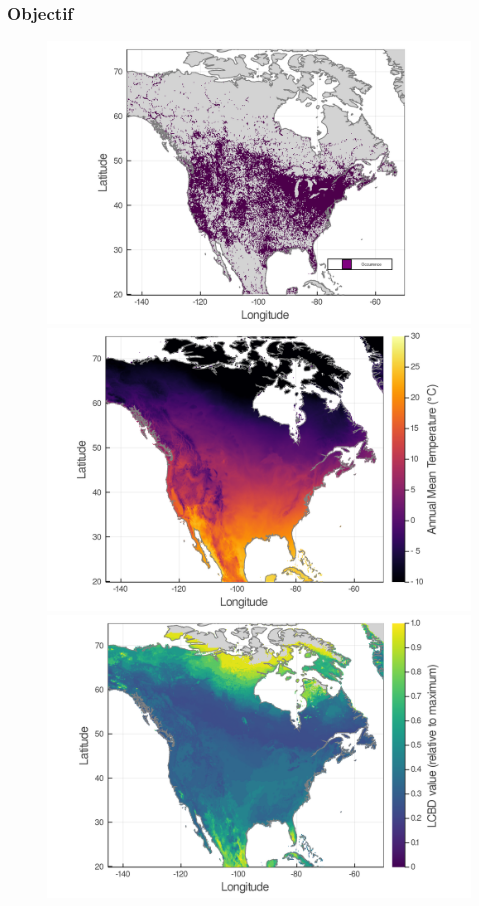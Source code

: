 \documentclass[10pt]{beamer}
\begin{document}
\begin{frame}
  \frametitle{Objectif}
  \begin{figure}
    \centering
    \hspace*{-0cm}\includegraphics[scale=0.05]{fig/01_raw_singlesp.png}
    \hspace*{0cm}\includegraphics[scale=0.05]{fig/wc_temp.png}
    \vfill
    \includegraphics[scale=0.10]{fig/05_sdm_lcbd.png}
  \end{figure}
\end{frame}
\end{document}
